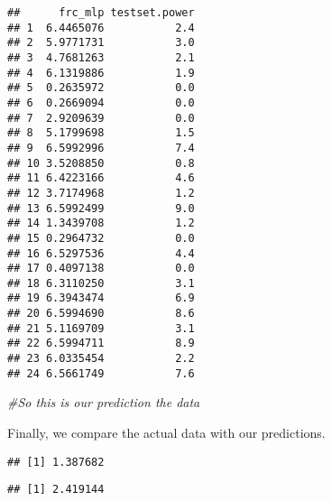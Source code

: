 \documentclass[
]{article}
\newenvironment{Shaded}{\begin{snugshade}}{\end{snugshade}}
\newcommand{\CommentTok}[1]{\textcolor[rgb]{0.56,0.35,0.01}{\textit{#1}}}
\newcommand{\DecValTok}[1]{\textcolor[rgb]{0.00,0.00,0.81}{#1}}
\newcommand{\KeywordTok}[1]{\textcolor[rgb]{0.13,0.29,0.53}{\textbf{#1}}}
\newcommand{\NormalTok}[1]{#1}
\newcommand{\OperatorTok}[1]{\textcolor[rgb]{0.81,0.36,0.00}{\textbf{#1}}}
\newcommand{\StringTok}[1]{\textcolor[rgb]{0.31,0.60,0.02}{#1}}
\begin{document}
\begin{Shaded}
\end{Shaded}

\begin{verbatim}
##      frc_mlp testset.power
## 1  6.4465076           2.4
## 2  5.9771731           3.0
## 3  4.7681263           2.1
## 4  6.1319886           1.9
## 5  0.2635972           0.0
## 6  0.2669094           0.0
## 7  2.9209639           0.0
## 8  5.1799698           1.5
## 9  6.5992996           7.4
## 10 3.5208850           0.8
## 11 6.4223166           4.6
## 12 3.7174968           1.2
## 13 6.5992499           9.0
## 14 1.3439708           1.2
## 15 0.2964732           0.0
## 16 6.5297536           4.4
## 17 0.4097138           0.0
## 18 6.3110250           3.1
## 19 6.3943474           6.9
## 20 6.5994690           8.6
## 21 5.1169709           3.1
## 22 6.5994711           8.9
## 23 6.0335454           2.2
## 24 6.5661749           7.6
\end{verbatim}

\begin{Shaded}
\begin{Highlighting}[]
\CommentTok{#So this is our prediction  the data}
\end{Highlighting}
\end{Shaded}

Finally, we compare the actual data with our predictions.

\begin{Shaded}
\end{Shaded}

\begin{verbatim}
## [1] 1.387682
\end{verbatim}

\begin{Shaded}
\end{Shaded}

\begin{verbatim}
## [1] 2.419144
\end{verbatim}
\end{document}
